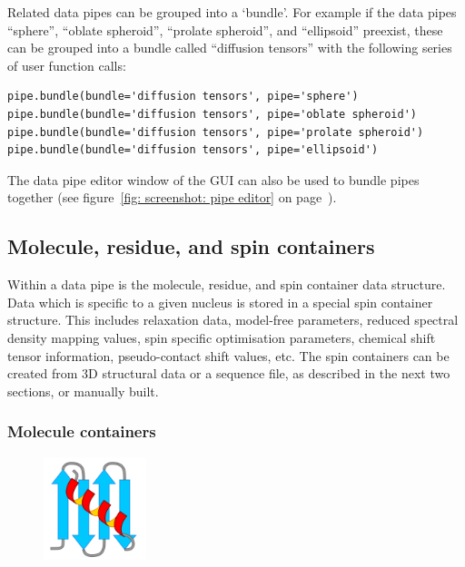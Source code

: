 Related data pipes can be grouped into a `bundle'.
For example if the data pipes ``sphere'', ``oblate spheroid'', ``prolate spheroid'', and ``ellipsoid'' preexist, these can be grouped into a bundle called ``diffusion tensors'' with the following series of user function calls:

\begin{lstlisting}
pipe.bundle(bundle='diffusion tensors', pipe='sphere')
pipe.bundle(bundle='diffusion tensors', pipe='oblate spheroid')
pipe.bundle(bundle='diffusion tensors', pipe='prolate spheroid')
pipe.bundle(bundle='diffusion tensors', pipe='ellipsoid')
\end{lstlisting}

The data pipe editor window of the GUI can also be used to bundle pipes together (see figure~\ref{fig: screenshot: pipe editor} on page~\pageref{fig: screenshot: pipe editor}).




\subsection{Molecule, residue, and spin containers}

Within a data pipe is the molecule, residue, and spin container data structure.
Data which is specific to a given nucleus is stored in a special spin container structure.
This includes relaxation data, model-free parameters, reduced spectral density mapping values, spin specific optimisation parameters, chemical shift tensor information, pseudo-contact shift values, etc.
The spin containers can be created from 3D structural data or a sequence file, as described in the next two sections, or manually built.



\subsubsection{Molecule containers}

\begin{figure}[h]
  \includegraphics[width=3cm, bb=0 0 1701 1701]{graphics/misc/molecule_600x600}
\end{figure}

